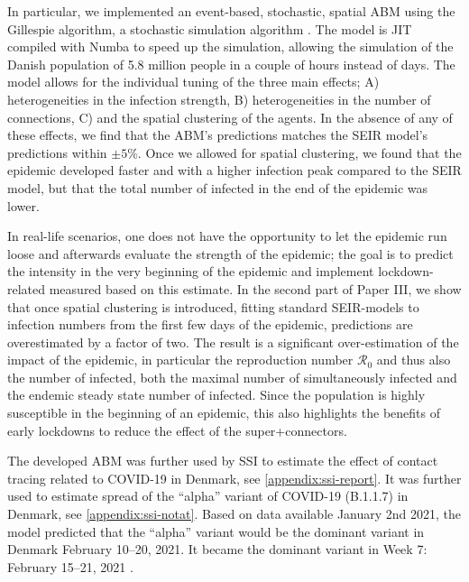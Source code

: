In particular, we implemented an event-based, stochastic, spatial ABM using the Gillespie algorithm, a stochastic simulation algorithm \autocite{gillespieExactStochasticSimulation1977}. The model is JIT compiled with Numba \autocite{lamNumbaLLVMbasedPython2015} to speed up the simulation, allowing the simulation of the Danish population of 5.8 million people in a couple of hours instead of days. The model allows for the individual tuning of the three main effects; A) heterogeneities in the infection strength, B) heterogeneities in the number of connections, C) and the spatial clustering of the agents. In the absence of any of these effects, we find that the ABM's predictions matches the SEIR model's predictions within $\pm 5 \%$. Once we allowed for spatial clustering, we found that the epidemic developed faster and with a higher infection peak compared to the SEIR model, but that the total number of infected in the end of the epidemic was lower.

In real-life scenarios, one does not have the opportunity to let the epidemic run loose and afterwards evaluate the strength of the epidemic; the goal is to predict the intensity in the very beginning of the epidemic and implement lockdown-related measured based on this estimate. In the second part of Paper III, we show that once spatial clustering is introduced, fitting standard SEIR-models to infection numbers from the first few days of the epidemic, predictions are overestimated by a factor of two. The result is a significant over-estimation of the impact of the epidemic, in particular the reproduction number $\mathcal{R}_0$ and thus also the number of infected, both the maximal number of simultaneously infected and the endemic steady state number of infected. Since the population is highly susceptible in the beginning of an epidemic, this also highlights the benefits of early lockdowns to reduce the effect of the super+connectors.


The developed ABM was further used by SSI to estimate the effect of contact tracing related to COVID-19 in Denmark, see \autoref{appendix:ssi-report}. It was further used to estimate spread of the ``alpha'' variant of COVID-19 (B.1.1.7) in Denmark, see \autoref{appendix:ssi-notat}. Based on data available January 2nd 2021, the model predicted that the ``alpha'' variant would be the dominant variant in Denmark February 10--20, 2021. It became the dominant variant in Week 7: February 15--21, 2021 \autocite{bagerRiskHospitalisationAssociated2021}.
